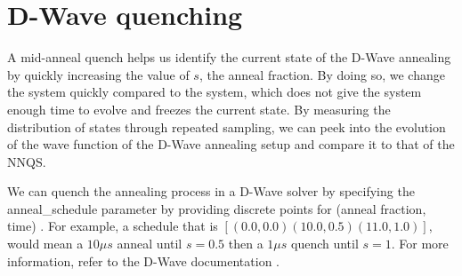 \chapter{D-Wave quenching}\label{appendix:quenching}
A mid-anneal quench helps us identify the current state of the D-Wave annealing by quickly increasing the value of $s$, the anneal fraction. By doing so, we change the system quickly compared to the system, which does not give the system enough time to evolve and freezes the current state. By measuring the distribution of states through repeated sampling, we can peek into the evolution of the wave function of the D-Wave annealing setup and compare it to that of the NNQS.

We can quench the annealing process in a D-Wave solver by specifying the anneal\_schedule parameter by providing discrete points for (anneal fraction, time) \cite{dwaveadvantage}. For example, a schedule that is $[(0.0,0.0)(10.0,0.5)(11.0,1.0)]$, would mean a $10 \mu s$ anneal until $s=0.5$ then a $1 \mu s$ quench until $s=1$. For more information, refer to the D-Wave documentation \cite{dwavequench}.